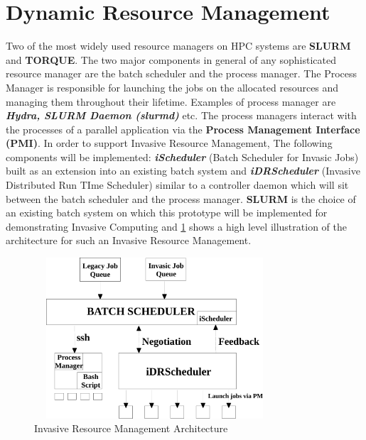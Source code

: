 \section{Dynamic Resource Management}
Two of the most widely used resource managers on HPC systems are \textbf{SLURM} and \textbf{TORQUE}. The two major components in general of any sophisticated resource manager are the batch scheduler and the process manager. The Process Manager is responsible for launching the jobs on the allocated resources and managing them throughout their lifetime. Examples of process manager are \textbf{\textit{Hydra, SLURM Daemon (slurmd)}} etc. The process managers interact with the processes of a parallel application via the \textbf{Process Management Interface (PMI)}. In order to support Invasive Resource Management, The following components will be implemented: \textbf{\textit{iScheduler}} (Batch Scheduler for Invasic Jobs) built as an extension into an existing batch system and \textbf{\textit{iDRScheduler}} (Invasive Distributed Run TIme Scheduler) similar to a controller daemon which will sit between the batch scheduler and the process manager. \textbf{SLURM} is the choice of an existing batch system on which this prototype will be implemented for demonstrating Invasive Computing and \ref{fig:1} shows a high level illustration of the architecture for such an Invasive Resource Management.\\ \par
\begin{figure}[!htbp]
\centering
\includegraphics[width=0.8\textwidth, height=60mm]{./figures/architecture.pdf}
\caption{Invasive Resource Management Architecture}
\label{fig:1}
\end{figure}
\noindent
